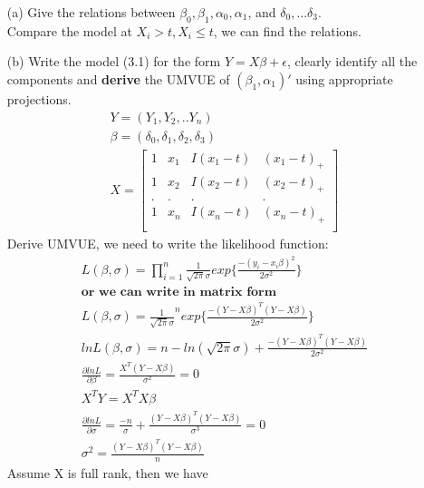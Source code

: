 \begin{itemize}
    \item [(a)] Give the relations between $\beta_0, \beta_1, \alpha_0, \alpha_1$, and $\delta_0,... \delta_3$.\\
    Compare the model at $X_i>t, X_i \leq t$, we can find the relations. 
    \item [(b)] Write the model (3.1) for the form $Y=X\beta + \epsilon$, clearly identify all the components and \textbf{derive} the UMVUE of $(\beta_1, \alpha_1)'$ using appropriate projections.\\
    \[ 
    \begin{split}
     Y = (Y_1, Y_2,.. Y_n) \\
     \beta = (\delta_0, \delta_1, \delta_2, \delta_3)\\
     X=  \begin{bmatrix}
           1 & x_1 & I(x_1 - t) & (x_1 -t)_{+} \\
           1 & x_2 & I(x_2 - t) & (x_2 -t)_{+}\\
           . & . & . & .\\
           1 & x_n & I(x_n - t) & (x_n -t)_{+}\\
         \end{bmatrix} 
    \end{split}
    \]     
    Derive UMVUE, we need to write the likelihood function:\\
    \[ 
    \begin{split}
    L(\beta, \sigma) = \prod_{i=1}^n \frac{1}{\sqrt{2\pi}\sigma} exp\{\frac{-(y_i-x_i\beta)^2}{2\sigma^2}\} \\
    \textbf{or we can write in matrix form}\\
    L(\beta, \sigma) = \frac{1}{\sqrt{2\pi}\sigma}^n exp\{\frac{-(Y-X\beta)^T(Y-X\beta)}{2\sigma^2}\} \\
    ln L(\beta, \sigma) = n -ln(\sqrt{2\pi}\sigma) + \frac{-(Y-X\beta)^T(Y-X\beta)}{2\sigma^2} \\
    \frac{\partial lnL}{\partial \beta} = \frac{X^T(Y-X\beta)}{\sigma^2} = 0\\
    X^TY = X^TX\beta\\
    \frac{\partial lnL}{\partial \sigma} = \frac{-n}{\sigma} + \frac{(Y-X\beta)^T(Y-X\beta)}{\sigma^3} = 0\\
    \sigma^2 = \frac{(Y-X\beta)^T(Y-X\beta)}{n}
    \end{split}
    \]     
    Assume X is full rank, then we have 
    \[ 
    \begin{split}

\end{split}\]
\end{itemize}
